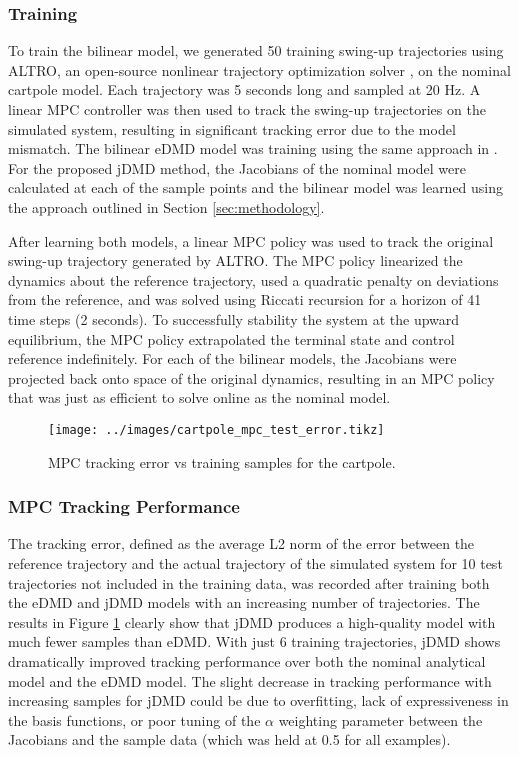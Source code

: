 \documentclass{article}
\begin{document}
\subsubsection{Training}
To train the bilinear model, we generated 50 training swing-up trajectories using ALTRO, an
open-source nonlinear trajectory optimization solver , on the 
nominal cartpole model. Each trajectory was 5 seconds long and sampled at 20 Hz.  A linear
MPC controller was then used to track the swing-up trajectories on the simulated system,
resulting in significant tracking error due to the model mismatch. The bilinear eDMD model
was training using the same approach in \cite{Folkestad2021}. For the proposed jDMD method,
the Jacobians of the nominal model were calculated at each of the sample points and the 
bilinear model was learned using the approach outlined in Section \ref{sec:methodology}.

After learning both models, a linear MPC policy was used to track the original swing-up
trajectory generated by ALTRO. The MPC policy linearized the dynamics about the reference 
trajectory, used a quadratic penalty on deviations from the reference, and was solved using 
Riccati recursion for a horizon of 41 time steps (2 seconds). To successfully stability the 
system at the upward equilibrium, the MPC policy extrapolated the terminal state and control
reference indefinitely. For each of the bilinear models, the Jacobians were projected back 
onto space of the original dynamics, resulting in an MPC policy that was just as efficient
to solve online as the nominal model. 

\begin{figure}[t]
  \centering
  \texttt{[image: ../images/cartpole\_mpc\_test\_error.tikz]}
  \label{fig:cartpole_mpc_test_error}
  \caption{MPC tracking error vs training samples for the cartpole.}
\end{figure}

\subsubsection{MPC Tracking Performance}
The tracking error, defined as the average L2 norm of the error between the reference 
trajectory and the actual trajectory of the simulated system for 10 test trajectories not 
included in the training data, was recorded after training both the eDMD and jDMD models
with an increasing number of trajectories. The results in Figure
\ref{fig:cartpole_mpc_test_error} clearly show that jDMD produces a high-quality model with
much fewer samples than eDMD. With just 6 training trajectories, jDMD shows dramatically
improved tracking performance over both the nominal analytical model and the eDMD model. The
slight decrease in tracking performance with increasing samples for jDMD could be due to 
overfitting, lack of expressiveness in the basis functions, or poor tuning of the $\alpha$ 
weighting parameter between the Jacobians and the sample data (which was held at 0.5 for all
examples).
\end{document}
